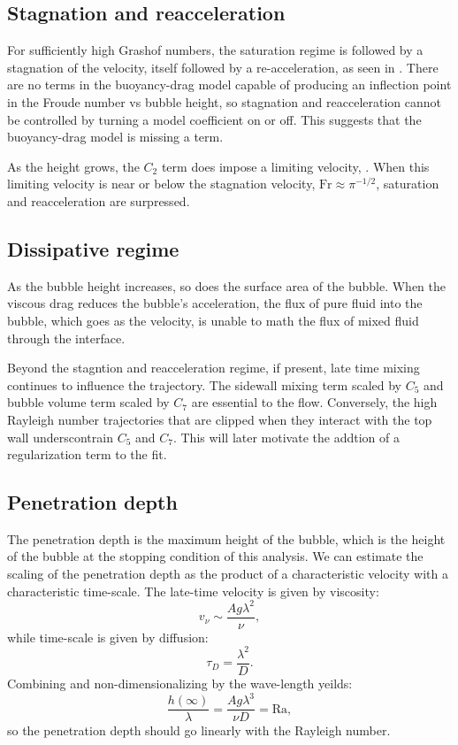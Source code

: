 \subsection{Stagnation and reacceleration}

For sufficiently high Grashof numbers, the saturation regime is followed by a stagnation of the velocity, itself followed by a re-acceleration, as seen in .
There are no terms in the buoyancy-drag model capable of producing an inflection point in the Froude number vs bubble height, so stagnation and reacceleration cannot be controlled by turning a model coefficient on or off.
This suggests that the buoyancy-drag model is missing a term.

As the height grows, the $C_2$ term does impose a limiting velocity, .
When this limiting velocity is near or below the stagnation velocity, $\text{Fr} \approx \pi^{-1/2}$, saturation and reacceleration are surpressed.


\subsection{Dissipative regime}

As the bubble height increases, so does the surface area of the bubble.
When the viscous drag reduces the bubble's acceleration, the flux of pure fluid into the bubble, which goes as the velocity, is unable to math the flux of mixed fluid through the interface.

Beyond the stagntion and reacceleration regime, if present, late time mixing continues to influence the trajectory.
The sidewall mixing term scaled by $C_5$ and bubble volume term scaled by $C_7$ are essential to the flow.
Conversely, the high Rayleigh number trajectories that are clipped when they interact with the top wall underscontrain $C_5$ and $C_7$.
This will later motivate the addtion of a regularization term to the fit.

\subsection{Penetration depth}

The penetration depth is the maximum height of the bubble, which is the height of the bubble at the stopping condition of this analysis.
We can estimate the scaling of the penetration depth as the product of a characteristic velocity with a characteristic time-scale.
The late-time velocity is given by viscosity:
\begin{equation}
v_\nu \sim \frac{ A g \lambda^2}{\nu},
\end{equation}
while time-scale is given by diffusion:
\begin{equation}
\tau_D = \frac{\lambda^2}{D}.
\end{equation}
Combining and non-dimensionalizing by the wave-length yeilds:
\begin{equation}
\frac{h(\infty)}{\lambda} = \frac{A g \lambda^3}{\nu D} = \text{Ra},
\end{equation}
so the penetration depth should go linearly with the Rayleigh number.

